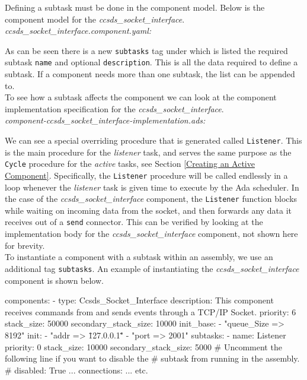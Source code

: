 Defining a subtask must be done in the component model. Below is the component model for the \textit{ccsds\_socket\_interface}. \\

\textit{ccsds\_socket\_interface.component.yaml:} 

As can be seen there is a new \texttt{subtasks} tag under which is listed the required subtask \texttt{name} and optional \texttt{description}. This is all the data required to define a subtask. If a component needs more than one subtask, the list can be appended to. \\

To see how a subtask affects the component we can look at the component implementation specification for the \textit{ccsds\_socket\_interface}. \\

\textit{component-ccsds\_socket\_interface-implementation.ads:} 

We can see a special overriding procedure that is generated called \texttt{Listener}. This is the main procedure for the \textit{listener} task, and serves the same purpose as the \texttt{Cycle} procedure for the \textit{active} tasks, see Section \ref{Creating an Active Component}. Specifically, the \texttt{Listener} procedure will be called endlessly in a loop whenever the \textit{listener} task is given time to execute by the Ada scheduler. In the case of the \textit{ccsds\_socket\_interface} component, the \texttt{Listener} function blocks while waiting on incoming data from the socket, and then forwards any data it receives out of a \texttt{send} connector. This can be verified by looking at the implementation body for the \textit{ccsds\_socket\_interface} component, not shown here for brevity. \\

To instantiate a component with a subtask within an assembly, we use an additional tag \texttt{subtasks}. An example of instantiating the \textit{ccsds\_socket\_interface} component is shown below.

\vspace{5mm} %
\begin{yamlcode}
components:
  - type: Ccsds_Socket_Interface
    description: This component receives commands from and sends events through a TCP/IP Socket.
    priority: 6
    stack_size: 50000
    secondary_stack_size: 10000
    init_base:
      - "queue_Size => 8192"
    init:
      - "addr => \"127.0.0.1\""
      - "port => 2001"
    subtasks:
      - name: Listener
        priority: 0
        stack_size: 10000
        secondary_stack_size: 5000
        # Uncomment the following line if you want to disable the
        # subtask from running in the assembly.
        # disabled: True   
  ... 
connections: 
  ...
  etc.
\end{yamlcode}
\vspace{5mm} %

